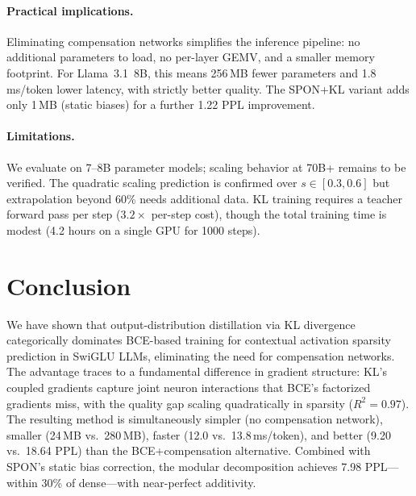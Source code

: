 \documentclass[11pt,a4paper]{article}
\begin{document}
\paragraph{Practical implications.}
Eliminating compensation networks simplifies the inference pipeline: no additional parameters to load, no per-layer GEMV, and a smaller memory footprint.
For Llama~3.1~8B, this means 256\,MB fewer parameters and 1.8\,ms/token lower latency, with strictly better quality.
The SPON+KL variant adds only 1\,MB (static biases) for a further 1.22 PPL improvement.

\paragraph{Limitations.}
We evaluate on 7--8B parameter models; scaling behavior at 70B+ remains to be verified.
The quadratic scaling prediction is confirmed over $s \in [0.3, 0.6]$ but extrapolation beyond 60\% needs additional data.
KL training requires a teacher forward pass per step ($3.2\times$ per-step cost), though the total training time is modest (4.2 hours on a single GPU for 1000 steps).

\section{Conclusion}

We have shown that output-distribution distillation via KL divergence categorically dominates BCE-based training for contextual activation sparsity prediction in SwiGLU LLMs, eliminating the need for compensation networks.
The advantage traces to a fundamental difference in gradient structure: KL's coupled gradients capture joint neuron interactions that BCE's factorized gradients miss, with the quality gap scaling quadratically in sparsity ($R^2 = 0.97$).
The resulting method is simultaneously simpler (no compensation network), smaller (24\,MB vs.\ 280\,MB), faster (12.0 vs.\ 13.8\,ms/token), and better (9.20 vs.\ 18.64 PPL) than the BCE+compensation alternative.
Combined with SPON's static bias correction, the modular decomposition achieves 7.98 PPL---within 30\% of dense---with near-perfect additivity.


\end{document}
